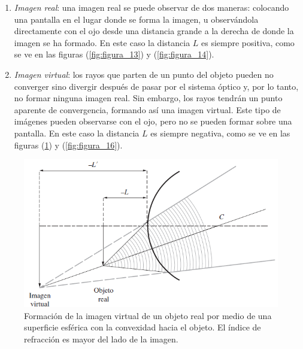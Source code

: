 \documentclass[14pt]{extarticle}
\begin{document}
\begin{enumerate}[label=\roman*)]
\item \textit{Imagen real}: una imagen real se puede observar de dos maneras: colocando una pantalla en el lugar donde se forma la imagen, u observándola directamente con el ojo desde una distancia grande a la derecha de donde la imagen se ha formado. En este caso la distancia $L$ es siempre positiva, como se ve en las figuras (\ref{fig:figura_13}) y (\ref{fig:figura_14}).
\item \textit{Imagen virtual}: los rayos que parten de un punto del objeto pueden no converger sino divergir después de pasar por el sistema óptico y, por lo tanto, no formar ninguna imagen real. Sin embargo, los rayos tendrán un punto aparente de convergencia, formando así una imagen virtual. Este tipo de imágenes pueden observarse con el ojo, pero no se pueden formar sobre una pantalla. En este caso la distancia $L$ es siempre negativa, como se ve en las figuras (\ref{fig:figura_15}) y (\ref{fig:figura_16}).
\end{enumerate}
\begin{figure}[H]
    \centering
    \includegraphics[scale=0.75]{Imagenes/Optica_Geometrica_11.png}
    \caption{Formación de la imagen virtual de un objeto real por medio de una superficie esférica con la convexidad hacia el objeto. El índice de refracción es mayor del lado de la imagen.}
    \label{fig:figura_15}
\end{figure}
\end{document}

